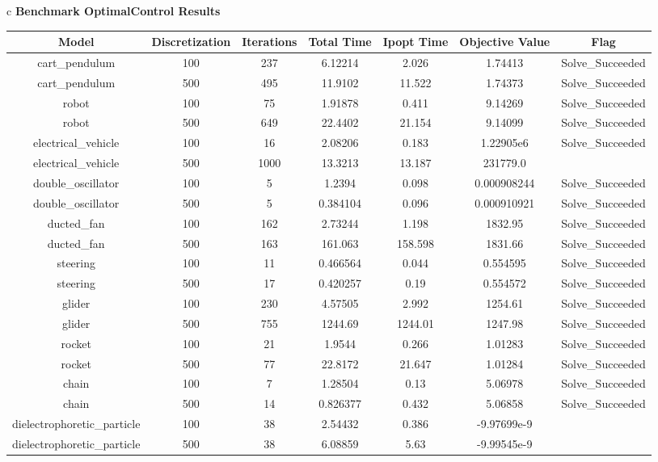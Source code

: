\documentclass{standalone}
\begin{document}
\begin{tabular}{c}
\hline
\Large\textbf{Benchmark OptimalControl Results}\\
\begin{tabular}{ccccccc}
  \hline
  \textbf{Model} & \textbf{Discretization} & \textbf{Iterations} & \textbf{Total Time} & \textbf{Ipopt Time} & \textbf{Objective Value} & \textbf{Flag} \\\hline
  cart\_pendulum & 100 & 237 & 6.12214 & 2.026 & 1.74413 & Solve\_Succeeded \\
  cart\_pendulum & 500 & 495 & 11.9102 & 11.522 & 1.74373 & Solve\_Succeeded \\
  robot & 100 & 75 & 1.91878 & 0.411 & 9.14269 & Solve\_Succeeded \\
  robot & 500 & 649 & 22.4402 & 21.154 & 9.14099 & Solve\_Succeeded \\
  electrical\_vehicle & 100 & 16 & 2.08206 & 0.183 & 1.22905e6 & Solve\_Succeeded \\
  electrical\_vehicle & 500 & 1000 & 13.3213 & 13.187 & 231779.0 & \color{red}{Maximum\_Iterations\_Exceeded} \\
  double\_oscillator & 100 & 5 & 1.2394 & 0.098 & 0.000908244 & Solve\_Succeeded \\
  double\_oscillator & 500 & 5 & 0.384104 & 0.096 & 0.000910921 & Solve\_Succeeded \\
  ducted\_fan & 100 & 162 & 2.73244 & 1.198 & 1832.95 & Solve\_Succeeded \\
  ducted\_fan & 500 & 163 & 161.063 & 158.598 & 1831.66 & Solve\_Succeeded \\
  steering & 100 & 11 & 0.466564 & 0.044 & 0.554595 & Solve\_Succeeded \\
  steering & 500 & 17 & 0.420257 & 0.19 & 0.554572 & Solve\_Succeeded \\
  glider & 100 & 230 & 4.57505 & 2.992 & 1254.61 & Solve\_Succeeded \\
  glider & 500 & 755 & 1244.69 & 1244.01 & 1247.98 & Solve\_Succeeded \\
  rocket & 100 & 21 & 1.9544 & 0.266 & 1.01283 & Solve\_Succeeded \\
  rocket & 500 & 77 & 22.8172 & 21.647 & 1.01284 & Solve\_Succeeded \\
  chain & 100 & 7 & 1.28504 & 0.13 & 5.06978 & Solve\_Succeeded \\
  chain & 500 & 14 & 0.826377 & 0.432 & 5.06858 & Solve\_Succeeded \\
  dielectrophoretic\_particle & 100 & 38 & 2.54432 & 0.386 & -9.97699e-9 & \color{red}{Infeasible\_Problem\_Detected} \\
  dielectrophoretic\_particle & 500 & 38 & 6.08859 & 5.63 & -9.99545e-9 & \color{red}{Infeasible\_Problem\_Detected} \\\hline
\end{tabular}
\end{tabular}
\end{document}
